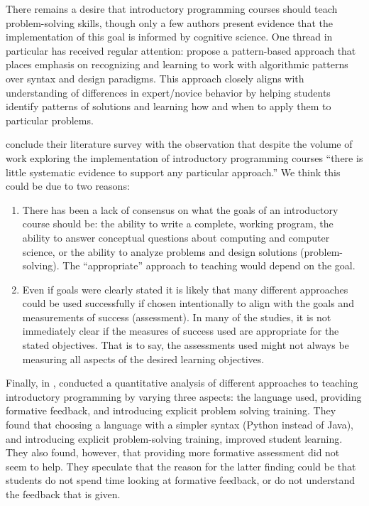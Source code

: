 \documentclass[12pt]{article}
\begin{document}
There remains a desire that introductory programming courses should
teach problem-solving skills, though only a few authors present
evidence that the implementation of this goal is informed by cognitive
science\autocite{kramarski_cognitivemetacognitive_1997,reed_incorporating_1998,muller_supporting_2008}. One
thread in particular has received regular attention:
\citeauthor{east_patternbased_1996} propose a pattern-based approach
that places emphasis on recognizing and learning to work with
algorithmic patterns over syntax and design
paradigms\autocite{east_patternbased_1996}. This approach closely
aligns with understanding of differences in expert/novice behavior by
helping students identify patterns of solutions and learning how and
when to apply them to particular
problems\autocite{east_patternbased_1996,muller_pattern_2005,wallingford_first_1996,reed_incorporating_1998}.

\citeauthor{pears_survey_2007-1} conclude their
\citeyear{pears_survey_2007-1} literature survey with the observation
that despite the volume of work exploring the implementation of
introductory programming courses ``there is little systematic evidence
to support any particular approach.''\autocite{pears_survey_2007-1}
We think this could be due to two reasons:

\begin{enumerate}
\item There has been a lack of consensus on what the goals of an
  introductory course should be: the ability to write a complete,
  working program, the ability to answer conceptual questions about
  computing and computer science, or the ability to analyze problems
  and design solutions (problem-solving). The ``appropriate'' approach
  to teaching would depend on the goal.

\item Even if goals were clearly stated it is likely that many
  different approaches could be used successfully if chosen
  intentionally to align with the goals and measurements of success
  (assessment). In many of the studies, it is not immediately clear if
  the measures of success used are appropriate for the stated
  objectives. That is to say, the assessments used might not always be
  measuring all aspects of the desired learning objectives.
\end{enumerate}

Finally, in \citeyear{koulouri_teaching_2014},
\citeauthor{koulouri_teaching_2014} conducted a quantitative analysis
of different approaches to teaching introductory programming by
varying three aspects: the language used, providing formative
feedback, and introducing explicit problem solving
training\autocite{koulouri_teaching_2014}. They found that choosing a
language with a simpler syntax (Python instead of Java), and
introducing explicit problem-solving training, improved student
learning. They also found, however, that providing more formative
assessment did not seem to help. They speculate that the reason for
the latter finding could be that students do not spend time looking at
formative feedback, or do not understand the feedback that is given.
\end{document}

